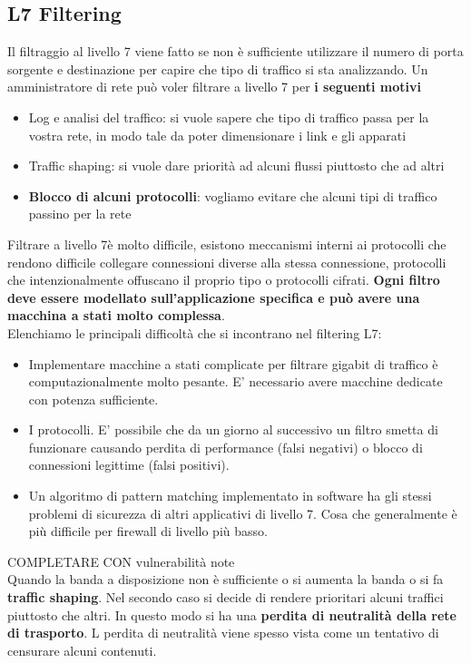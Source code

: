 \documentclass[12pt]{article}
\begin{document}
		\subsection{L7 Filtering}
			Il filtraggio al livello 7 viene fatto se non è sufficiente utilizzare il numero di porta sorgente e destinazione per capire che tipo di traffico si sta analizzando. Un amministratore di rete può voler filtrare a livello 7 per \textbf{i seguenti motivi}
			\begin{itemize}
				\item Log e analisi del traffico: si vuole sapere che tipo di traffico passa per la vostra rete, in modo tale da poter dimensionare i link e gli apparati
				\item Traffic shaping: si vuole dare priorità ad alcuni flussi piuttosto che ad altri
				\item \textbf{Blocco di alcuni protocolli}: vogliamo evitare che alcuni tipi di traffico passino per la rete
			\end{itemize}
			Filtrare a livello 7è molto difficile, esistono meccanismi interni ai protocolli che rendono difficile collegare connessioni diverse alla stessa connessione, protocolli che intenzionalmente offuscano il proprio tipo o protocolli cifrati. \textbf{Ogni filtro deve essere modellato sull'applicazione specifica e può avere una macchina a stati molto complessa}. \\
			Elenchiamo le principali difficoltà che si incontrano nel filtering L7:
			\begin{itemize}
				\item Implementare macchine a stati complicate per filtrare gigabit di traffico è computazionalmente molto pesante. E’ necessario avere macchine
				dedicate con potenza sufficiente.
				\item I protocolli. E’ possibile che da un giorno al successivo un filtro smetta di
				funzionare causando perdita di performance (falsi negativi) o blocco di
				connessioni legittime (falsi positivi).
				\item Un algoritmo di pattern matching implementato in software ha gli stessi
				problemi di sicurezza di altri applicativi di livello 7. Cosa che
				generalmente è più difficile per firewall di livello più basso.
			\end{itemize} 
			
			COMPLETARE CON vulnerabilità note \\
			
			Quando la banda a disposizione non è sufficiente o si aumenta la banda o si fa \textbf{traffic shaping}. Nel secondo caso si decide di rendere prioritari alcuni traffici piuttosto che altri. In questo modo si ha una \textbf{perdita di neutralità della rete di trasporto}. L perdita di neutralità viene spesso vista come un tentativo di censurare alcuni contenuti.\\
			
\end{document}
